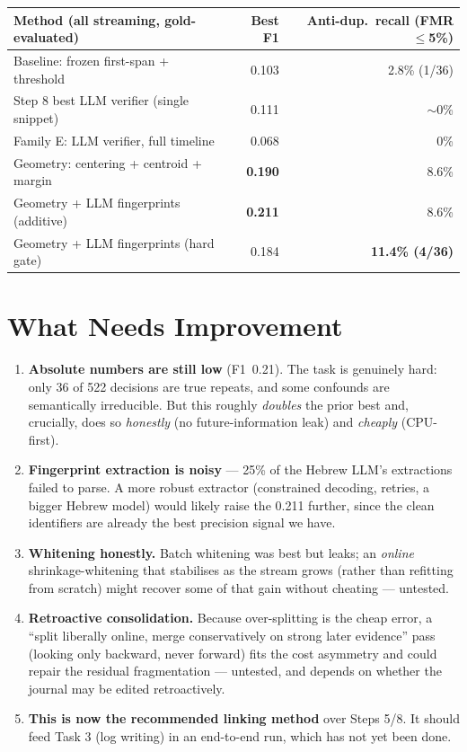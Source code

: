 \documentclass[11pt,a4paper]{article}
\begin{document}
\begin{center}
\small
\begin{tabular}{lrr}
\toprule
\textbf{Method (all streaming, gold-evaluated)} & \textbf{Best F1} & \textbf{Anti-dup.\ recall (FMR$\le$5\%)} \\
\midrule
Baseline: frozen first-span + threshold & 0.103 & 2.8\% (1/36) \\
Step 8 best LLM verifier (single snippet) & 0.111 & $\sim$0\% \\
Family E: LLM verifier, full timeline & 0.068 & 0\% \\
Geometry: centering + centroid + margin & \textbf{0.190} & 8.6\% \\
Geometry + LLM fingerprints (additive) & \textbf{0.211} & 8.6\% \\
Geometry + LLM fingerprints (hard gate) & 0.184 & \textbf{11.4\% (4/36)} \\
\bottomrule
\end{tabular}
\end{center}

\section{What Needs Improvement}

\begin{enumerate}[leftmargin=1.4em]
  \item \textbf{Absolute numbers are still low} (F1~0.21). The task is genuinely hard: only
        36 of 522 decisions are true repeats, and some confounds are semantically
        irreducible. But this roughly \emph{doubles} the prior best and, crucially, does so
        \emph{honestly} (no future-information leak) and \emph{cheaply} (CPU-first).
  \item \textbf{Fingerprint extraction is noisy} --- 25\% of the Hebrew LLM's extractions
        failed to parse. A more robust extractor (constrained decoding, retries, a bigger
        Hebrew model) would likely raise the 0.211 further, since the clean identifiers are
        already the best precision signal we have.
  \item \textbf{Whitening honestly.} Batch whitening was best but leaks; an \emph{online}
        shrinkage-whitening that stabilises as the stream grows (rather than refitting from
        scratch) might recover some of that gain without cheating --- untested.
  \item \textbf{Retroactive consolidation.} Because over-splitting is the cheap error, a
        ``split liberally online, merge conservatively on strong later evidence'' pass
        (looking only backward, never forward) fits the cost asymmetry and could repair the
        residual fragmentation --- untested, and depends on whether the journal may be edited
        retroactively.
  \item \textbf{This is now the recommended linking method} over Steps 5/8. It should feed
        Task 3 (log writing) in an end-to-end run, which has not yet been done.
\end{enumerate}
\end{document}
